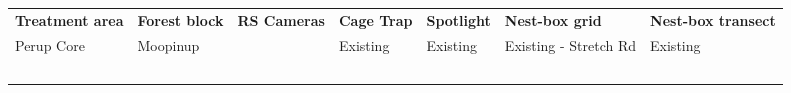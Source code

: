 \documentclass[version=last,
    paper=a4,                               %
    10pt,                                   %
    dvipsnames,
    oneside,                              %
    headings=openany,                       %
    open=any,
    BCOR=7mm,                               %
    DIV=15,     %
]{scrbook}
\begin{document}
\begin{longtable}[c]{@{}lllllll@{}}
\toprule\addlinespace
\begin{minipage}[t]{0.12\columnwidth}\raggedright
\textbf{Treatment area}
\end{minipage} & \begin{minipage}[t]{0.12\columnwidth}\raggedright
\textbf{Forest block}
\end{minipage} & \begin{minipage}[t]{0.12\columnwidth}\raggedright
\textbf{RS Cameras}
\end{minipage} & \begin{minipage}[t]{0.12\columnwidth}\raggedright
\textbf{Cage Trap}
\end{minipage} & \begin{minipage}[t]{0.12\columnwidth}\raggedright
\textbf{Spotlight}
\end{minipage} & \begin{minipage}[t]{0.12\columnwidth}\raggedright
\textbf{Nest-box grid}
\end{minipage} & \begin{minipage}[t]{0.12\columnwidth}\raggedright
\textbf{Nest-box transect}
\end{minipage}
\\\addlinespace
\begin{minipage}[t]{0.12\columnwidth}\raggedright
Perup Core
\end{minipage} & \begin{minipage}[t]{0.12\columnwidth}\raggedright
Moopinup
\end{minipage} & \begin{minipage}[t]{0.12\columnwidth}\raggedright
~
\end{minipage} & \begin{minipage}[t]{0.12\columnwidth}\raggedright
Existing
\end{minipage} & \begin{minipage}[t]{0.12\columnwidth}\raggedright
Existing
\end{minipage} & \begin{minipage}[t]{0.12\columnwidth}\raggedright
Existing - Stretch Rd
\end{minipage} & \begin{minipage}[t]{0.12\columnwidth}\raggedright
Existing
\end{minipage}
\\\addlinespace
\begin{minipage}[t]{0.12\columnwidth}\raggedright
~
\end{minipage} & \begin{minipage}[t]{0.12\columnwidth}\raggedright

\end{minipage}
\end{longtable}
\end{document}
